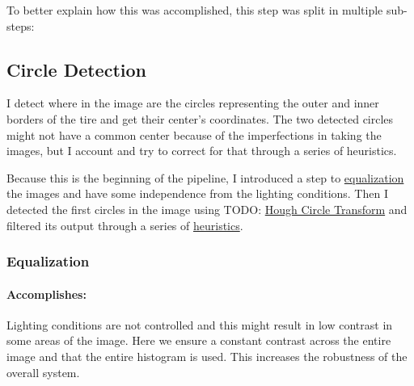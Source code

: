 To better explain how this was accomplished, this step was split in multiple sub-steps:

\subsection{Circle Detection}

I detect where in the image are the circles representing the outer and inner borders of the tire and get their center’s coordinates. The two detected circles might not have a common center because of the imperfections in taking the images, but I account and try to correct for that through a series of heuristics.

Because this is the beginning of the pipeline, I introduced a step to \hyperref[subsubsec:equalization]{equalization} the images and have some independence from the lighting conditions. Then I detected the first circles in the image using TODO: \hyperref[subsubsec:hough_circles_transform]{Hough Circle Transform} and filtered its output through a series of \hyperref[subsubsec:circ_det_heuristics]{heuristics}.

\subsubsection{Equalization}
\label{subsubsec:equalization}

\paragraph*{Accomplishes:}\mbox{}\par
Lighting conditions are not controlled and this might result in low contrast in some areas of the image. Here we ensure a constant contrast across the entire image and that the entire histogram is used. This increases the robustness of the overall system.

